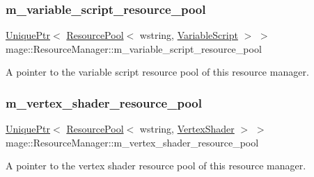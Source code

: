 \subsubsection{\texorpdfstring{m\+\_\+variable\+\_\+script\+\_\+resource\+\_\+pool}{m\_variable\_script\_resource\_pool}}
{\footnotesize\ttfamily \hyperlink{namespacemage_a3316d7143a973e37adf1110f2e80ca31}{Unique\+Ptr}$<$ \hyperlink{classmage_1_1_resource_pool}{Resource\+Pool}$<$ wstring, \hyperlink{classmage_1_1_variable_script}{Variable\+Script} $>$ $>$ mage\+::\+Resource\+Manager\+::m\+\_\+variable\+\_\+script\+\_\+resource\+\_\+pool\hspace{0.3cm}{\ttfamily [private]}}

A pointer to the variable script resource pool of this resource manager. \hypertarget{classmage_1_1_resource_manager_aee4af101fb42e8524121f18c16c76931}{}\label{classmage_1_1_resource_manager_aee4af101fb42e8524121f18c16c76931} 
\subsubsection{\texorpdfstring{m\+\_\+vertex\+\_\+shader\+\_\+resource\+\_\+pool}{m\_vertex\_shader\_resource\_pool}}
{\footnotesize\ttfamily \hyperlink{namespacemage_a3316d7143a973e37adf1110f2e80ca31}{Unique\+Ptr}$<$ \hyperlink{classmage_1_1_resource_pool}{Resource\+Pool}$<$ wstring, \hyperlink{classmage_1_1_vertex_shader}{Vertex\+Shader} $>$ $>$ mage\+::\+Resource\+Manager\+::m\+\_\+vertex\+\_\+shader\+\_\+resource\+\_\+pool\hspace{0.3cm}{\ttfamily [private]}}

A pointer to the vertex shader resource pool of this resource manager. 